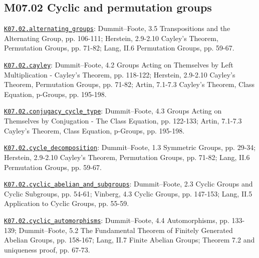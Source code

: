\subsection*{M07.02 Cyclic and permutation groups}
\par\smallskip\noindent\hypertarget{src:K07.02.alternating_groups}{}\label{src:K07.02.alternating_groups}\hyperref[K07.02.alternating_groups]{\texttt{K07.02.alternating\_groups}}: Dummit--Foote, 3.5 Transpositions and the Alternating Group, pp. 106-111; Herstein, 2.9-2.10 Cayley's Theorem, Permutation Groups, pp. 71-82; Lang, II.6 Permutation Groups, pp. 59-67.
\par\smallskip\noindent\hypertarget{src:K07.02.cayley}{}\label{src:K07.02.cayley}\hyperref[K07.02.cayley]{\texttt{K07.02.cayley}}: Dummit--Foote, 4.2 Groups Acting on Themselves by Left Multiplication - Cayley's Theorem, pp. 118-122; Herstein, 2.9-2.10 Cayley's Theorem, Permutation Groups, pp. 71-82; Artin, 7.1-7.3 Cayley's Theorem, Class Equation, p-Groups, pp. 195-198.
\par\smallskip\noindent\hypertarget{src:K07.02.conjugacy_cycle_type}{}\label{src:K07.02.conjugacy_cycle_type}\hyperref[K07.02.conjugacy_cycle_type]{\texttt{K07.02.conjugacy\_cycle\_type}}: Dummit--Foote, 4.3 Groups Acting on Themselves by Conjugation - The Class Equation, pp. 122-133; Artin, 7.1-7.3 Cayley's Theorem, Class Equation, p-Groups, pp. 195-198.
\par\smallskip\noindent\hypertarget{src:K07.02.cycle_decomposition}{}\label{src:K07.02.cycle_decomposition}\hyperref[K07.02.cycle_decomposition]{\texttt{K07.02.cycle\_decomposition}}: Dummit--Foote, 1.3 Symmetric Groups, pp. 29-34; Herstein, 2.9-2.10 Cayley's Theorem, Permutation Groups, pp. 71-82; Lang, II.6 Permutation Groups, pp. 59-67.
\par\smallskip\noindent\hypertarget{src:K07.02.cyclic_abelian_and_subgroups}{}\label{src:K07.02.cyclic_abelian_and_subgroups}\hyperref[K07.02.cyclic_abelian_and_subgroups]{\texttt{K07.02.cyclic\_abelian\_and\_subgroups}}: Dummit--Foote, 2.3 Cyclic Groups and Cyclic Subgroups, pp. 54-61; Vinberg, 4.3 Cyclic Groups, pp. 147-153; Lang, II.5 Application to Cyclic Groups, pp. 55-59.
\par\smallskip\noindent\hypertarget{src:K07.02.cyclic_automorphisms}{}\label{src:K07.02.cyclic_automorphisms}\hyperref[K07.02.cyclic_automorphisms]{\texttt{K07.02.cyclic\_automorphisms}}: Dummit--Foote, 4.4 Automorphisms, pp. 133-139; Dummit--Foote, 5.2 The Fundamental Theorem of Finitely Generated Abelian Groups, pp. 158-167; Lang, II.7 Finite Abelian Groups; Theorem 7.2 and uniqueness proof, pp. 67-73.
